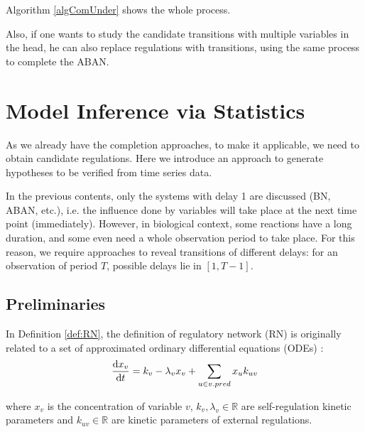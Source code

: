 Algorithm \ref{algComUnder} shows the whole process.

Also, if one wants to study the candidate transitions with multiple variables in the head, he can also replace regulations with transitions, using the same process to complete the ABAN. 

\section{Model Inference via Statistics}
As we already have the completion approaches, to make it applicable, we need to obtain candidate regulations.
Here we introduce an approach to generate hypotheses to be verified from time series data.

In the previous contents, only the systems with delay 1 are discussed (BN, ABAN, etc.), i.e. the influence done by variables will take place at the next time point (immediately).
However, in biological context, some reactions have a long duration, and some even need a whole observation period to take place.
For this reason, we require approaches to reveal transitions of different delays: for an observation of period $T$, possible delays lie in $[1,T-1]$.

\subsection{Preliminaries}
In Definition \ref{def:RN}, the definition of regulatory network (RN) is originally related to a set of approximated ordinary differential equations (ODEs) \cite{khalis2009smbionet}:
$$\dfrac{{\rm d}x_v}{{\rm d}t}=k_v-\lambda_v x_v +\sum_{u\in v.pred}{x_uk_{uv}}$$

where $x_v$ is the concentration of variable $v$, $k_v, \lambda_v\in \mathbb{R}$ are self-regulation kinetic parameters and $k_{uv}\in \mathbb{R}$ are kinetic parameters of external regulations.


